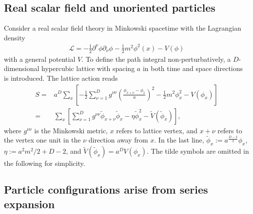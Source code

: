\documentclass[12pt]{article}
\theoremstyle{definition}
\begin{document}
\subsection{Real scalar field and unoriented particles}

Consider a real scalar field theory in Minkowski spacetime with the Lagrangian density
\begin{align}
    \mathcal{L}=-\frac{1}{2}\partial^\nu \phi \partial_\nu \phi-\frac{1}{2} m^2\phi^2(x) - V(\phi)
\end{align}
with a general potential $V$. To define the path integral non-perturbatively, a $D$-dimensional hypercubic lattice with spacing $a$ in both time and space directions is introduced. The lattice action reads
\begin{align}
S=&a^D \sum_x [ -\frac{1}{2} \sum_{\nu=1}^D g^{\nu\nu}(\frac{\phi_{x+\nu}-\phi_x}{a})^2 - \frac{1}{2} m^2 \phi_x^2 - V(\phi_x)]
\\
=& \sum_x [ \sum_{\nu=1}^D g^{\nu\nu} \tilde{\phi}_{x+\nu} \tilde{\phi}_{x} - \eta \tilde{\phi}_x^2  - \tilde{V}(\tilde{\phi}_x)],\label{eq:rsal3}
\end{align}
where $g^{\nu\nu}$ is the Minkowski metric, $x$ refers to lattice vertex, and $x+\nu$ refers to the vertex one unit in the $\nu$ direction away from $x$.
In the last line, $\tilde{\phi}_x:= a^{\frac{D-2}{2}}\phi_x$, $\eta:=a^2 m^2/2 + D-2$, and $\tilde{V}(\tilde{\phi}_x)=a^D V(\phi_{x})$. The tilde symbols are omitted in the following for simplicity.

\subsection*{Particle configurations arise from series expansion}
\end{document}
